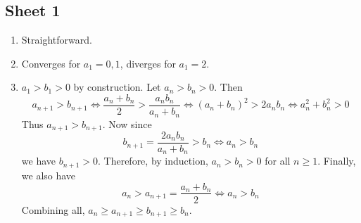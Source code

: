 \documentclass[10pt, a4paper, twoside]{report}
\begin{document}
\subsection{Sheet 1}
\begin{enumerate}[{1.}]
    \item Straightforward.
    \item Converges for \(a_1=0,1\), diverges for \(a_1=2\).

    \item \(a_1>b_1>0\) by construction. Let \(a_n>b_n>0\). Then 
    \[a_{n+1}>b_{n+1}\Leftrightarrow\frac{a_n+b_n}{2}>\frac{a_nb_n}{a_n+b_n}\Leftrightarrow(a_n+b_n)^2>2a_nb_n\Leftrightarrow a_n^2+b_n^2>0\]
    Thus \(a_{n+1}>b_{n+1}\). Now since 
    \[b_{n+1}=\frac{2a_nb_n}{a_n+b_n}>b_n\Leftrightarrow a_n>b_n\]
    we have \(b_{n+1}>0\). Therefore, by induction, \(a_n>b_n>0\) for all \(n\geq 1\). Finally, we also have 
    \[a_n>a_{n+1}=\frac{a_n+b_n}{2}\Leftrightarrow a_n>b_n\]
    Combining all, \(a_n\geq a_{n+1}\geq b_{n+1}\geq b_n\).


\end{enumerate}
\end{document}
